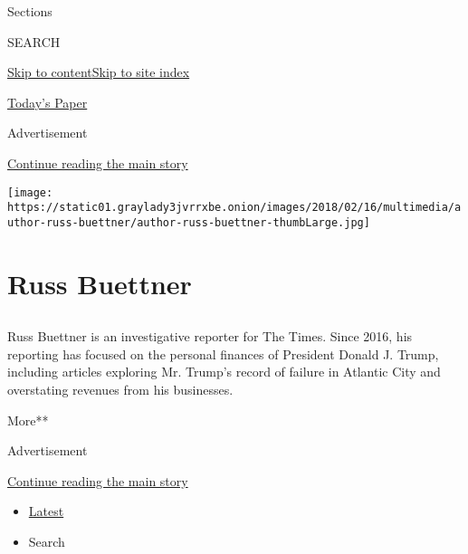 Sections

SEARCH

\protect\hyperlink{site-content}{Skip to
content}\protect\hyperlink{site-index}{Skip to site index}

\href{https://myaccount.nytimes3xbfgragh.onion/auth/login?response_type=cookie\&client_id=vi}{}

\href{https://www.nytimes3xbfgragh.onion/section/todayspaper}{Today's
Paper}

Advertisement

\protect\hyperlink{after-top}{Continue reading the main story}

\texttt{[image: https://static01.graylady3jvrrxbe.onion/images/2018/02/16/multimedia/author-russ-buettner/author-russ-buettner-thumbLarge.jpg]}

\hypertarget{russ-buettner}{%
\section{Russ Buettner}\label{russ-buettner}}

\subsection{}

Russ Buettner is an investigative reporter for The Times. Since 2016,
his reporting has focused on the personal finances of President Donald
J. Trump, including articles exploring Mr. Trump's record of failure in
Atlantic City and overstating revenues from his businesses.

More**

Advertisement

\protect\hyperlink{after-mid1}{Continue reading the main story}

\begin{itemize}
\tightlist
\item
  \protect\hyperlink{stream-panel}{Latest}
\item
  Search
\end{itemize}

